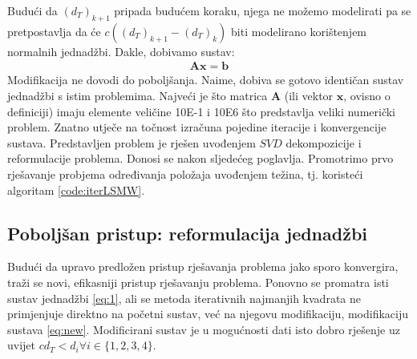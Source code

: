 \documentclass[a4paper,twoside,12pt]{memoir} %
\begin{document}
Budući da $(d_T)_{k+1}$ pripada budućem koraku, njega ne možemo modelirati pa se pretpostavlja da
će $c((d_T)_{k+1}-(d_T)_{k})$ biti modelirano korištenjem normalnih jednadžbi. Dakle, dobivamo sustav:
\begin{align}\label{eq:sustav2}
\mathbf{A}\mathbf{x} = \mathbf{b}
\end{align}
Modifikacija ne dovodi do poboljšanja. Naime, dobiva se gotovo identičan sustav jednadžbi s istim problemima.
Najveći je što matrica $\mathbf{A}$ (ili vektor $\mathbf{x}$, ovisno o definiciji) imaju elemente veličine 10E-1 i 
10E6 što predstavlja veliki numerički problem. Znatno utječe na točnost izračuna pojedine iteracije i konvergencije sustava.
Predstavljen problem je rješen uvođenjem $SVD$ dekompozicije i reformulacije problema.
Donosi se nakon sljedećeg poglavlja. Promotrimo prvo rješavanje probjema određivanja položaja uvođenjem težina, tj. 
koristeći algoritam \ref{code:iterLSMW}.

\subsection{Poboljšan pristup: reformulacija jednadžbi}
Budući da upravo predložen pristup rješavanja problema jako sporo konvergira, traži se
novi, efikasniji pristup rješavanju problema. Ponovno se promatra isti sustav jednadžbi \ref{eq:1}, ali se 
metoda iterativnih najmanjih kvadrata ne primjenjuje direktno na početni sustav, već na njegovu modifikaciju, modifikaciju sustava \ref{eq:new}.
Modificirani sustav je u mogućnosti dati isto dobro rješenje uz uvijet $cd_T < d_i \forall i \in \{1,2,3,4\}$. \\
\end{document}
